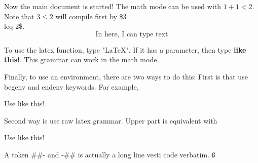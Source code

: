 \documentclass[item,korean]{coprime}
\begin{document}
Now the main document is started! The math mode can be used with $1+1<2$.
Note that $3\leq 2$ will compile first by \$3\\leq 2\$.
\[
    \text{In here, I can type text}
\]

To use the latex function, type "LaTeX". If it has a parameter,
then type \textbf{like this!}. This grammar can work in the math mode.

Finally, to use an environment, there are two ways to do this:
First is that use begenv and endenv keywords. For example,
\begin{center}
    \begin{minipage}{0.7\textwidth}
        Use like this!
    \end{minipage}
\end{center}

Second way is use raw latex grammar. Upper part is equivalent with

\begin{center}
    \begin{minipage}{0.7\textwidth}
        Use like this!
    \end{minipage}
\end{center}


A token \#\#- and -\#\# is actually a long line vesti code verbatim.
ß
\end{document}
